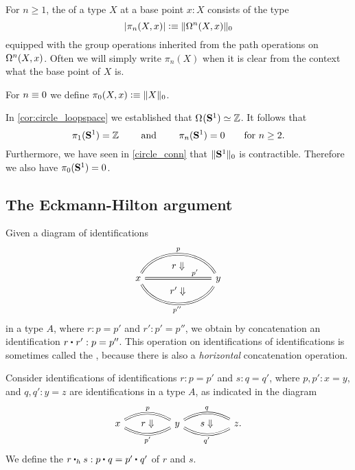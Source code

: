 \begin{defn}
For $n\geq 1$, the  of a type $X$ at a base point $x:X$ consists of the type
\begin{equation*}
|\pi_n(X,x)| \defeq \trunc{0}{\loopspace[n]{X,x}}
\end{equation*}
equipped with the group operations inherited from the path operations on $\loopspace[n]{X,x}$. 
Often we will simply write $\pi_n(X)$ when it is clear from the context what the base point of $X$ is.

For $n\jdeq 0$ we define $\pi_0(X,x)\defeq \trunc{0}{X}$. 
\end{defn}

\begin{eg}
In \cref{cor:circle_loopspace} we established that $\eqv{\loopspace{\sphere{1}}}{\Z}$. It follows that
\begin{equation*}
\pi_1(\sphere{1})=\Z \qquad\text{ and }\qquad\pi_n(\sphere{1})=0\qquad\text{for $n\geq 2$.}
\end{equation*}
Furthermore, we have seen in \cref{circle_conn} that $\trunc{0}{\sphere{1}}$ is contractible. 
Therefore we also have $\pi_0(\sphere{1})=0$.
\end{eg}

\subsection{The Eckmann-Hilton argument}

Given a diagram of identifications
\begin{equation*}
\begin{tikzcd}[column sep=7em]
x \arrow[r,equals,bend left=60,"p",""{name=A,below}] \arrow[r,equals,""{name=B},""{name=E,below},"{p'}"{near end}] \arrow[r,equals,bend right=60,"{p''}"{below},""{name=F,above}] \arrow[from=A,to=B,phantom,"r\Downarrow"] \arrow[from=E,to=F,phantom,"{r'\Downarrow}"] 
& y
\end{tikzcd}
\end{equation*}
in a type $A$, where $r:p=p'$ and $r':p'=p''$,
we obtain by concatenation an identification $\ct{r}{r'}:p=p''$. This operation on identifications of identifications is sometimes called the , because there is also a \emph{horizontal} concatenation operation.

\begin{defn}
Consider identifications of identifications $r:p=p'$ and $s:q=q'$, where $p,p':x=y$, and $q,q':y=z$ are identifications in a type $A$, as indicated in the diagram
\begin{equation*}
\begin{tikzcd}[column sep=huge]
x \arrow[r,equals,bend left=30,"p",""{name=A,below}] \arrow[r,equals,bend right=30,""{name=B,above},"{p'}"{below}] \arrow[from=A,to=B,phantom,"r\Downarrow"] & y \arrow[r,equals,bend left=30,"q",""{name=C,below}] \arrow[r,equals,bend right=30,""{name=D,above},"{q'}"{below}] \arrow[from=C,to=D,phantom,"s\Downarrow"] & z.
\end{tikzcd}
\end{equation*}
We define the  $\ct[h]{r}{s}:\ct{p}{q}=\ct{p'}{q'}$ of $r$ and $s$.
\end{defn}

